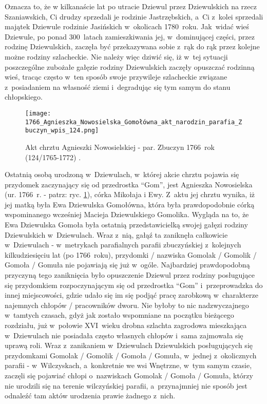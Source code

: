 Oznacza to, że w kilkanaście lat po utracie Dziewul przez Dziewulskich na 
rzecz Szaniawskich, Ci drudzy sprzedali je rodzinie Jastrzębskich, 
a~Ci z~kolei sprzedali majątek Dziewule rodzinie Jasińskich w~okolicach 
1780~roku. Jak~widać wieś Dziewule, po ponad 300~latach zamieszkiwania jej, 
w~dominującej części, przez rodzinę Dziewulskich, zaczęła być przekazywana 
sobie z~rąk do rąk przez kolejne możne rodziny szlacheckie. Nie należy więc 
dziwić się, iż w~tej sytuacji poszczególne zubożałe gałęzie rodziny 
Dziewulskich zaczęły opuszczać rodzinną wieś, tracąc często w~ten sposób 
swoje przywileje szlacheckie związane z~posiadaniem na własność ziemi 
i~degradując się tym samym do stanu chłopskiego.

\begin{figure}[!ht]
    \vspace*{0.5cm}
    \centering \texttt{[image: 
        1766\_Agnieszka\_Nowosielska\_Gomołówna\_akt\_narodzin\_parafia\_Zbuczyn\_wpis\_124.png]}
    \captionsetup{format=hang}
    \caption{Akt chrztu Agnieszki Nowosielskiej - par. Zbuczyn 1766~rok 
    (124/1765-1772) \cite{par_zbuczyn4}.}
    \label{fig:anowosielska_1766}
\end{figure}

Ostatnią osobą urodzoną w~Dziewulach, w~której akcie chrztu pojawia się 
przydomek zaczynający się od przedrostka \enquote{Gom}, jest Agnieszka 
Nowosielska (ur. 1766~r. - patrz: ryc. \ref{fig:anowosielska_1766}), córka 
Mikołaja i Ewy. Z~aktu jej chrztu wynika, iż jej matką była Ewa Dziewulska 
Gomołówna, która była prawdopodobnie córką wspominanego wcześniej Macieja 
Dziewulskiego Gomolika. Wygląda na to, że Ewa Dziewulska Gomoła była ostatnią 
przedstawicielką swojej gałęzi rodziny Dziewulskich w~Dziewulach. Wraz z~nią, 
gałąź ta zaniknęła całkowicie w~Dziewulach - w~metrykach parafialnych parafii 
zbuczyńskiej z~kolejnych kilkudziesięciu lat (po 1766~roku), przydomki / 
nazwiska Gomolak / Gomolik / Gomoła / Gomuła nie pojawiają się już w~ogóle. 
Najbardziej prawdopodobną przyczyną tego zaniknięcia było opuszczenie Dziewul 
przez rodziny posługujące się przydomkiem rozpoczynającym się od przedrostka 
\enquote{Gom} i~przeprowadzka do innej miejscowości, gdzie udało się im się 
podjąć pracę zarobkową w~charakterze najemnych chłopów / pracowników dworu. 
Nie byłoby to nic nadzwyczajnego w~tamtych czasach, gdyż jak zostało 
wspomniane na początku bieżącego rozdziału, już w~połowie XVI~wieku drobna 
szlachta zagrodowa mieszkająca w~Dziewulach nie posiadała często własnych 
chłopów i~sama zajmowała się uprawą roli. Wraz z~zanikaniem w~Dziewulach 
Dziewulskich posługujących się przydomkami Gomolak / Gomolik / Gomoła / 
Gomuła, w~jednej z~okolicznych parafii - w~Wilczyskach, a~konkretnie we wsi 
Wnętrzne, w~tym samym czasie, zaczęli się pojawiać chłopi o~nazwiskach 
Gomolak / Gomoła / Gomuła, którzy nie urodzili się na terenie wilczyńskiej 
parafii, a~przynajmniej nie sposób jest odnaleźć tam aktów urodzenia prawie 
żadnego z~nich.